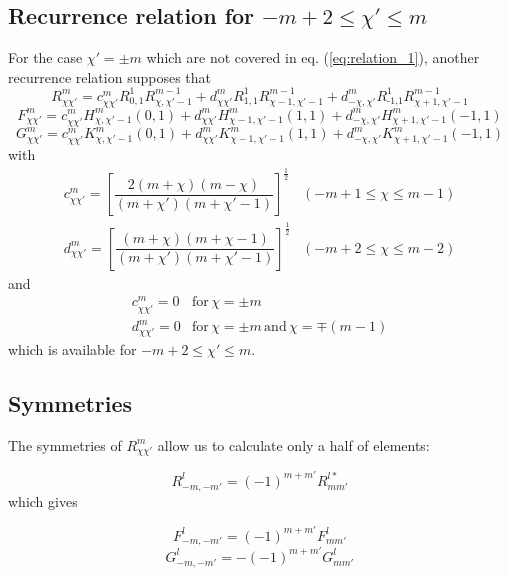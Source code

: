 \subsection{Recurrence relation for $-m+2\leq\chi'\leq m$}

For the case $\chi'=\pm m$ which are not covered in eq. (\ref{eq:relation_1}),
another recurrence relation supposes that
\begin{equation}
R_{\chi\chi'}^{m}=c_{\chi\chi'}^{m}R_{0,1}^{1}R_{\chi,\chi'-1}^{m-1}+d_{\chi\chi'}^{m}R_{1,1}^{1}R_{\chi-1,\chi'-1}^{m-1}+d_{-\chi,\chi'}^{m}R_{\text{-1,}1}^{1}R_{\chi+1,\chi'-1}^{m-1}
\end{equation}
\begin{equation}
F_{\chi\chi'}^{m}=c_{\chi\chi'}^{m}H_{\chi,\chi'-1}^{m}(0,1)+d_{\chi\chi'}^{m}H_{\chi-1,\chi'-1}^{m}(1,1)+d_{-\chi,\chi'}^{m}H_{\chi+1,\chi'-1}^{m}(-1,1)
\end{equation}
\begin{equation}
G_{\chi\chi'}^{m}=c_{\chi\chi'}^{m}K_{\chi,\chi'-1}^{m}(0,1)+d_{\chi\chi'}^{m}K_{\chi-1,\chi'-1}^{m}(1,1)+d_{-\chi,\chi'}^{m}K_{\chi+1,\chi'-1}^{m}(-1,1)
\end{equation}
with
\begin{equation}
\begin{array}{ll}
c_{\chi\chi'}^{m}=\left[\dfrac{2\left(m+\chi\right)\left(m-\chi\right)}{\left(m+\chi'\right)\left(m+\chi'-1\right)}\right]^{\frac{1}{2}} & (-m+1\leq\chi\leq m-1)\\
d_{\chi\chi'}^{m}=\left[\dfrac{\left(m+\chi\right)\left(m+\chi-1\right)}{\left(m+\chi'\right)\left(m+\chi'-1\right)}\right]^{\frac{1}{2}} & (-m+2\leq\chi\leq m-2)
\end{array}
\end{equation}
and
\begin{equation}
\begin{array}{ll}
c_{\chi\chi'}^{m}=0 & \mathrm{for}\,\chi=\pm m\\
d_{\chi\chi'}^{m}=0 & \mathrm{for}\,\chi=\pm m\,\mathrm{and}\,\chi=\mp(m-1)
\end{array}
\end{equation}
which is available for $-m+2\leq\chi'\leq m$.


\subsection{Symmetries}

The symmetries of $R_{\chi\chi'}^{m}$ allow us to calculate only
a half of elements: 

\begin{equation}
R_{-m,-m'}^{l}=\left(-1\right)^{m+m'}R_{mm'}^{l*}
\end{equation}
which gives

\begin{equation}
F_{-m,-m'}^{l}=\left(-1\right)^{m+m'}F_{mm'}^{l}
\end{equation}
\begin{equation}
G_{-m,-m'}^{l}=-\left(-1\right)^{m+m'}G_{mm'}^{l}
\end{equation}

